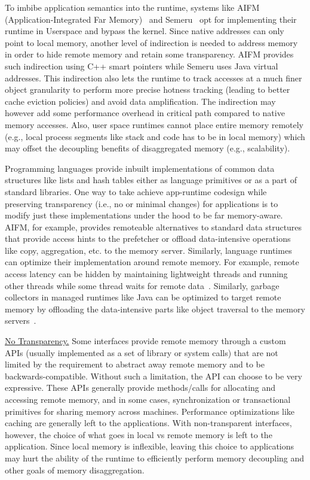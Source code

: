 To imbibe application semantics into the runtime, systems 
like AIFM (Application-Integrated Far Memory)~\cite{aifm} 
and Semeru~\cite{semeru} opt for implementing their runtime in 
Userspace and bypass the kernel. Since native addresses can 
only point to local memory, another level of indirection 
is needed to address memory in order to hide remote memory
and retain some transparency. AIFM provides such indirection 
using C++ smart pointers while Semeru 
uses Java virtual addresses. This indirection also lets 
the runtime to track accesses at a much finer object 
granularity to perform more precise hotness tracking 
(leading to better cache eviction policies) and avoid 
data amplification. The indirection may however add some 
performance overhead in critical path compared to native 
memory accesses. Also, user space runtimes cannot place entire 
memory remotely
(e.g., local process segments like stack and code has to be in 
local memory) which may offset the decoupling benefits of 
disaggregated memory (e.g., scalability).

Programming languages provide inbuilt implementations of 
common data structures like lists and hash tables either as 
language primitives or as a part of standard libraries. 
One way to take achieve app-runtime codesign while preserving 
transparency (i.e., no or minimal changes) for applications 
is to modify just these implementations under the hood to be 
far memory-aware. AIFM, for example, provides remoteable 
alternatives to standard data structures that provide access 
hints to the prefetcher or offload data-intensive operations 
like copy, aggregation, etc. to the memory server. Similarly,
language runtimes can optimize their implementation around 
remote memory. For example, remote access latency can 
be hidden by maintaining lightweight threads and running other
threads while some thread waits for remote data~\cite{aifm}.  
Similarly, garbage collectors in managed runtimes like Java
can be optimized to target remote memory by offloading the 
data-intensive parts like object traversal to the memory 
servers~\cite{semeru}.


\vspace{3pt}
\noindent \uline{No Transparency.}
Some interfaces provide remote memory through a custom APIs 
(usually implemented as a set of library or system calls) that 
are not limited by the requirement to abstract away remote 
memory and to be backwards-compatible. Without such a 
limitation, the API can choose to be very expressive.
These APIs generally provide methods/calls for allocating and 
accessing remote memory, and in some cases, synchronization or 
transactional primitives for sharing memory across machines. 
Performance optimizations like caching are generally left to 
the applications. With non-transparent interfaces, however,
the choice of what goes in local vs remote memory is left to 
the application. Since local memory is inflexible, leaving 
this choice to applications may hurt the ability of the 
runtime to efficiently perform memory decoupling and other 
goals of memory disaggregation.


